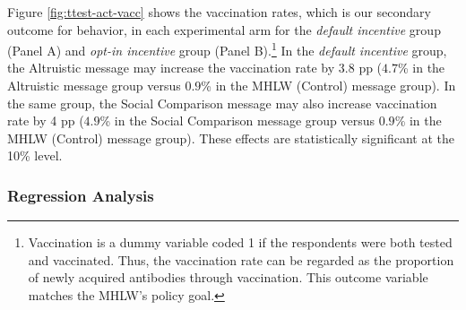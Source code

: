 \documentclass[
      12pt,
    a4paper
]{article}
\begin{document}
Figure \ref{fig:ttest-act-vacc} shows the vaccination rates, which is our secondary outcome for behavior, in each experimental arm for the \emph{default incentive} group (Panel A) and \emph{opt-in incentive} group (Panel B).\footnote{Vaccination is a dummy variable coded 1 if the respondents were both tested and vaccinated. Thus, the vaccination rate can be regarded as the proportion of newly acquired antibodies through vaccination. This outcome variable matches the MHLW's policy goal.} In the \emph{default incentive} group, the Altruistic message may increase the vaccination rate by \(3.8\) pp (\(4.7\)\% in the Altruistic message group versus \(0.9\)\% in the MHLW (Control) message group). In the same group, the Social Comparison message may also increase vaccination rate by 4 pp (\(4.9\)\% in the Social Comparison message group versus \(0.9\)\% in the MHLW (Control) message group). These effects are statistically significant at the 10\% level.

\hypertarget{regression-analysis-1}{%
\subsubsection{Regression Analysis}\label{regression-analysis-1}}
\end{document}
